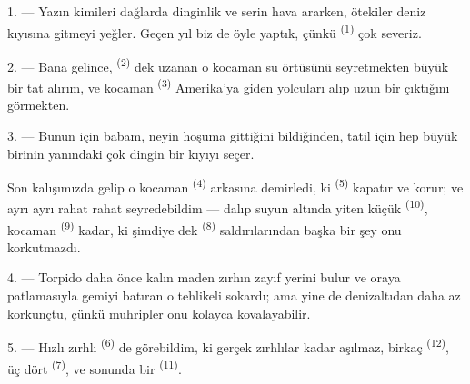 %

\VUsaut{4.0mm}
\VUsaut{3.0mm}
\VUsaut{3.0mm}

1. --- Yazın kimileri dağlarda dinginlik ve serin hava ararken, ötekiler deniz
kıyısına gitmeyi yeğler. Geçen yıl biz de öyle yaptık, çünkü
 \textsuperscript{(1)} çok severiz.

2. --- Bana gelince,  \textsuperscript{(2)} dek uzanan o kocaman
su örtüsünü seyretmekten büyük bir tat alırım, ve kocaman 
\textsuperscript{(3)} Amerika'ya giden yolcuları alıp uzun bir
 çıktığını görmekten.

3. --- Bunun için babam, neyin hoşuma gittiğini bildiğinden, tatil için hep
büyük  birinin yanındaki çok dingin bir kıyıyı
seçer.

Son kalışımızda  gelip o kocaman 
\textsuperscript{(4)} arkasına demirledi, ki 
\textsuperscript{(5)} kapatır ve korur; ve ayrı ayrı  rahat rahat seyredebildim --- dalıp suyun altında yiten küçük
 \textsuperscript{(10)}, kocaman 
\textsuperscript{(9)} kadar, ki şimdiye dek 
\textsuperscript{(8)} saldırılarından başka bir şey onu korkutmazdı.

\VUsaut{3.0mm}
\VUsaut{3.0mm}

4. --- Torpido daha önce  kalın maden zırhın zayıf yerini
bulur ve oraya patlamasıyla gemiyi batıran o tehlikeli  sokardı;
ama yine de denizaltıdan daha az korkunçtu, çünkü muhripler onu kolayca
kovalayabilir.

5. --- Hızlı zırhlı  \textsuperscript{(6)} de görebildim,
ki gerçek zırhlılar kadar aşılmaz, birkaç 
\textsuperscript{(12)}, üç dört  \textsuperscript{(7)}, ve
sonunda bir  \textsuperscript{(11)}.

